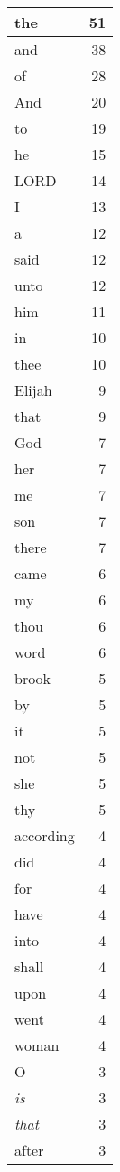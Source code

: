 \begin{center}
\begin{longtable}{l|r}
\hline \hline
\endlastfoot
the & 51 \\ \hline
and & 38 \\ \hline
of & 28 \\ \hline
And & 20 \\ \hline
to & 19 \\ \hline
he & 15 \\ \hline
LORD & 14 \\ \hline
I & 13 \\ \hline
a & 12 \\ \hline
said & 12 \\ \hline
unto & 12 \\ \hline
him & 11 \\ \hline
in & 10 \\ \hline
thee & 10 \\ \hline
Elijah & 9 \\ \hline
that & 9 \\ \hline
God & 7 \\ \hline
her & 7 \\ \hline
me & 7 \\ \hline
son & 7 \\ \hline
there & 7 \\ \hline
came & 6 \\ \hline
my & 6 \\ \hline
thou & 6 \\ \hline
word & 6 \\ \hline
brook & 5 \\ \hline
by & 5 \\ \hline
it & 5 \\ \hline
not & 5 \\ \hline
she & 5 \\ \hline
thy & 5 \\ \hline
according & 4 \\ \hline
did & 4 \\ \hline
for & 4 \\ \hline
have & 4 \\ \hline
into & 4 \\ \hline
shall & 4 \\ \hline
upon & 4 \\ \hline
went & 4 \\ \hline
woman & 4 \\ \hline
O & 3 \\ \hline
\emph{is} & 3 \\ \hline
\emph{that} & 3 \\ \hline
after & 3 \\ \hline

\end{longtable}
\end{center}
